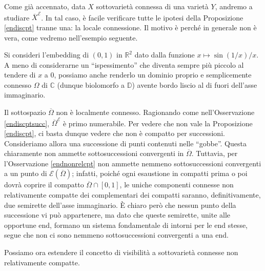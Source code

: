 \begin{oss} \label{servelocconn}
    Come già accennato, data $X$ sottovarietà connessa di una varietà $Y$, andremo a studiare $\overline{X}^\mathcal{E}$. In tal caso, è facile verificare tutte le ipotesi della Proposizione \ref{endiscpt} tranne una: la locale connessione. Il motivo è perché in generale non è vera, come vedremo nell'esempio seguente.
\end{oss}

\begin{ex} \label{servelocconnex}
    Si consideri l'embedding di $(0,1)$ in $\mathbb{R}^2$ dato dalla funzione $x\longmapsto \sin(1/x)/x$. A meno di considerarne un ``ispessimento'' che diventa sempre più piccolo al tendere di $x$ a $0$, possiamo anche renderlo un dominio proprio e semplicemente connesso $\Omega$ di $\mathbb{C}$ (dunque biolomorfo a $\mathbb{D}$) avente bordo liscio al di fuori dell'asse immaginario.

    Il sottospazio $\overline{\Omega}$ non è localmente connesso. Ragionando come nell'Osservazione \ref{endiscptsucc}, $\overline{\Omega}^\mathcal{E}$ è primo numerabile. Per vedere che non vale la Proposizione \ref{endiscpt}, ci basta dunque vedere che non è compatto per successioni. Consideriamo allora una successione di punti contenuti nelle ``gobbe''. Questa chiaramente non ammette sottosuccessioni convergenti in $\overline{\Omega}$. Tuttavia, per l'Osservazione \ref{endnonrelcpt} non ammette nemmeno sottosuccessioni convergenti a un punto di $\mathcal{E}(\overline{\Omega})$; infatti, poiché ogni esaustione in compatti prima o poi dovrà coprire il compatto $\overline{\Omega}\cap[0,1]$, le uniche componenti connesse non relativamente compatte dei complementari dei compatti saranno, definitivamente, due semirette dell'asse immaginario. È chiaro però che nessun punto della successione vi può appartenere, ma dato che queste semirette, unite alle opportune end, formano un sistema fondamentale di intorni per le end stesse, segue che non ci sono nemmeno sottosuccessioni convergenti a una end.
\end{ex}

Possiamo ora estendere il concetto di visibilità a sottovarietà connesse non relativamente compatte.

